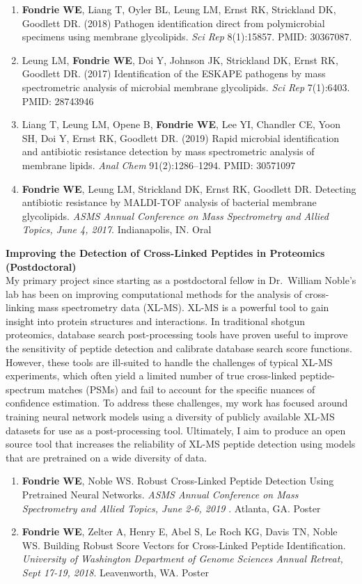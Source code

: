 \documentclass[11pt]{article}
\begin{document}
\begin{enumerate}
  \item {\bf Fondrie WE}, Liang T, Oyler BL, Leung LM, Ernst RK, Strickland DK, Goodlett DR. (2018) Pathogen identification direct from polymicrobial specimens using membrane glycolipids. {\it Sci Rep} 8(1):15857. PMID: 30367087.
  \item Leung LM, {\bf Fondrie WE}, Doi Y, Johnson JK, Strickland DK, Ernst RK, Goodlett DR. (2017) Identification of the ESKAPE pathogens by mass spectrometric analysis of microbial membrane glycolipids. {\it Sci Rep} 7(1):6403. PMID: 28743946
  \item Liang T, Leung LM, Opene B, {\bf Fondrie WE}, Lee YI, Chandler CE, Yoon SH, Doi Y, Ernst RK, Goodlett DR. (2019) Rapid microbial identification and antibiotic resistance detection by mass spectrometric analysis of membrane lipids. {\it Anal Chem} 91(2):1286--1294. PMID: 30571097
  \item {\bf Fondrie WE}, Leung LM, Strickland DK, Ernst RK, Goodlett DR. Detecting antibiotic resistance by MALDI-TOF analysis of bacterial membrane glycolipids. {\it ASMS Annual Conference on Mass Spectrometry and Allied Topics, June 4, 2017}. Indianapolis, IN. Oral
\end{enumerate}

{\bf Improving the Detection of Cross-Linked Peptides in Proteomics (Postdoctoral)} \\
My primary project since starting as a postdoctoral fellow in Dr.\ William Noble's lab has been on improving computational methods for the analysis of cross-linking mass spectrometry data (XL-MS). XL-MS is a powerful tool to gain insight into protein structures and interactions. In traditional shotgun proteomics, database search post-processing tools have proven useful to improve the sensitivity of peptide detection and calibrate database search score functions. However, these tools are ill-suited to handle the challenges of typical XL-MS experiments, which often yield a limited number of true cross-linked peptide-spectrum matches (PSMs) and fail to account for the specific nuances of confidence estimation. To address these challenges, my work has focused around training neural network models using a diversity of publicly available XL-MS datasets for use as a post-processing tool. Ultimately, I aim to produce an open source tool that increases the reliability of XL-MS peptide detection using models that are pretrained on a wide diversity of data.

\begin{enumerate}
  \item {\bf Fondrie WE}, Noble WS. Robust Cross-Linked Peptide Detection Using Pretrained Neural Networks. {\it ASMS Annual Conference on Mass Spectrometry and Allied Topics, June 2-6, 2019 }. Atlanta, GA. Poster 
  \item {\bf Fondrie WE}, Zelter A, Henry E, Abel S, Le Roch KG, Davis TN, Noble WS. Building Robust Score Vectors for Cross-Linked Peptide Identification. {\it University of Washington Department of Genome Sciences Annual Retreat, Sept 17-19, 2018}. Leavenworth, WA. Poster
\end{enumerate}
\end{document}
